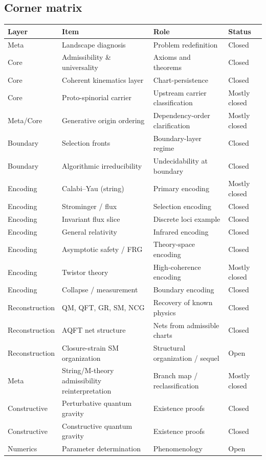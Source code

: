 \documentclass[11pt]{article}
\begin{document}
\subsection{Corner matrix}

\begin{center}
\begin{tabular}{|l|l|l|l|}
\hline
\textbf{Layer} & \textbf{Item} & \textbf{Role} & \textbf{Status} \\
\hline
Meta & Landscape diagnosis & Problem redefinition & Closed \\
\hline
Core & Admissibility \& universality & Axioms and theorems & Closed \\
\hline

Core & Coherent kinematics layer & Chart-persistence & Closed \\
\hline
Core & Proto-spinorial carrier & Upstream carrier classification & Mostly closed \\
\hline
Meta/Core & Generative origin ordering & Dependency-order clarification & Mostly closed \\

\hline
Boundary & Selection fronts & Boundary-layer regime & Closed \\
\hline
Boundary & Algorithmic irreducibility & Undecidability at boundary & Closed \\
\hline
Encoding & Calabi--Yau (string) & Primary encoding & Mostly closed \\
\hline
Encoding & Strominger / flux & Selection encoding & Closed \\
\hline
Encoding & Invariant flux slice & Discrete loci example & Closed \\
\hline
Encoding & General relativity & Infrared encoding & Closed \\
\hline
Encoding & Asymptotic safety / FRG & Theory-space encoding & Closed \\
\hline
Encoding & Twistor theory & High-coherence encoding & Mostly closed \\
\hline
Encoding & Collapse / measurement & Boundary encoding & Closed \\
\hline
Reconstruction & QM, QFT, GR, SM, NCG & Recovery of known physics & Closed \\
\hline
Reconstruction & AQFT net structure & Nets from admissible charts  & Closed\\
\hline
Reconstruction & Closure-strain SM organization & Structural organization / sequel & Open\\
\hline
Meta & String/M-theory admissibility reinterpretation & Branch map / reclassification & Mostly closed\\
\hline

Constructive & Perturbative quantum gravity & Existence proofs & Closed \\
\hline
Constructive & Constructive quantum gravity & Existence proofs & Closed \\
\hline
Numerics & Parameter determination & Phenomenology & Open \\
\hline
\end{tabular}
\end{center}
\end{document}
